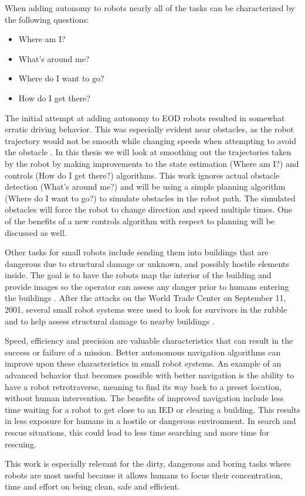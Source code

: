 When adding autonomy to robots nearly all of the tasks can be characterized by the following questions:
\begin{itemize}
\item Where am I?
\item What's around me?
\item Where do I want to go?
\item How do I get there?
\end{itemize}

The initial attempt at adding autonomy to EOD robots resulted in somewhat erratic driving behavior. This was especially evident near obstacles, as the robot trajectory would not be smooth while changing speeds when attempting to avoid the obstacle \cite{Bruch00}. In this thesis we will look at smoothing out the trajectories taken by the robot by making improvements to the state estimation (Where am I?) and controls (How do I get there?) algorithms. This work ignores actual obstacle detection (What's around me?) and will be using a simple planning algorithm (Where do I want to go?) to simulate obstacles in the robot path. The simulated obstacles will force the robot to change direction and speed multiple times. One of the benefits of a new controls algorithm with respect to planning will be discussed as well.

Other tasks for small robots include sending them into buildings that are dangerous due to structural damage or unknown, and possibly hostile elements inside. The goal is to have the robots map the interior of the building and provide images so the operator can assess any danger prior to humans entering the buildings \cite{CongressUGV06}. After the attacks on the World Trade Center on September 11, 2001, several small robot systems were used to look for survivors in the rubble and to help assess structural damage to nearby buildings \cite{Everett02}.

Speed, efficiency and precision are valuable characteristics that can result in the success or failure of a mission. Better autonomous navigation algorithms can improve upon these characteristics in small robot systems. An example of an advanced behavior that becomes possible with better navigation is the ability to have a robot retrotraverse, meaning to find its way back to a preset location, without human intervention. The benefits of improved navigation include less time waiting for a robot to get close to an IED or clearing a building. This results in less exposure for humans in a hostile or dangerous environment. In search and rescue situations, this could lead to less time searching and more time for rescuing.

This work is especially relevant for the dirty, dangerous and boring tasks where robots are most useful because it allows humans to focus their concentration, time and effort on being clean, safe and efficient.
